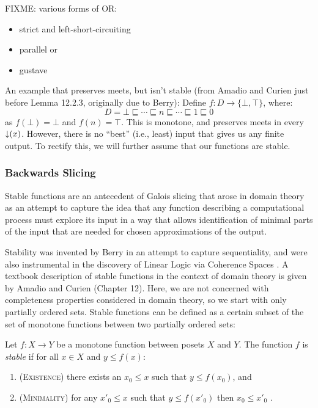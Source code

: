 \begin{example}
  FIXME: various forms of OR:
  \begin{itemize}
  \item strict and left-short-circuiting
  \item parallel or
  \item gustave
  \end{itemize}
\end{example}

\begin{example}
  An example that preserves meets, but isn't stable (from Amadio and
  Curien just before Lemma 12.2.3, originally due to Berry): Define
  $f : D \to \{\bot, \top\}$, where:
  \begin{displaymath}
    D = \bot \sqsubseteq \cdots \sqsubseteq n \sqsubseteq \cdots \sqsubseteq 1 \sqsubseteq 0
  \end{displaymath}
  as $f(\bot) = \bot$ and $f(n) = \top$. This is monotone, and
  preserves meets in every $\mathop{\downarrow}(x)$. However, there is no
  ``best'' (i.e., least) input that gives us any finite output. To
  rectify this, we will further assume that our functions are stable.
\end{example}

\subsubsection{Backwards Slicing}

Stable functions are an antecedent of Galois slicing that arose in
domain theory as an attempt to capture the idea that any function
describing a computational process must explore its input in a way
that allows identification of minimal parts of the input that are
needed for chosen approximations of the output.

Stability was invented by Berry \cite{berry79} in an attempt to capture
sequentiality, and were also instrumental in the discovery of Linear
Logic via Coherence Spaces \cite{girard}. A textbook description of
stable functions in the context of domain theory is given by Amadio
and Curien \cite{amadio-curien} (Chapter 12). Here, we are not
concerned with completeness properties considered in domain theory, so
we start with only partially ordered sets. Stable functions can be
defined as a certain subset of the set of monotone functions between
two partially ordered sets:

\begin{definition}
  Let $f : X \to Y$ be a monotone function between posets $X$ and
  $Y$. The function $f$ is \emph{stable} if for all $x \in X$ and
  $y \leq f(x)$:
  \begin{enumerate}
  \item (\textsc{Existence}) there exists an $x_0 \leq x$ such that $y \leq f(x_0)$, and
  \item (\textsc{Minimality}) for any $x'_0 \leq x$ such that $y \leq f(x'_0)$ then
    $x_0 \leq x'_0$ .
  \end{enumerate}
\end{definition}

